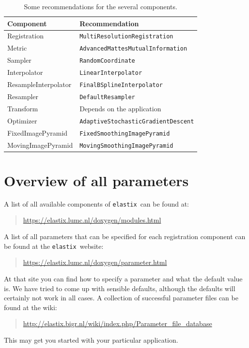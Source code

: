 \documentclass[]{report}
\newcommand{\elastix}{\texttt{elastix}}
\begin{document}
\begin{table}[htb]
\centering
\begin{tabular}{l|p{15em}}
\textbf{Component} & \textbf{Recommendation} \\
\hline
Registration & \texttt{MultiResolutionRegistration} \\
Metric       & \texttt{AdvancedMattesMutualInformation} \\
Sampler      & \texttt{RandomCoordinate} \\
Interpolator & \texttt{LinearInterpolator} \\
ResampleInterpolator & \texttt{FinalBSplineInterpolator} \\
Resampler    & \texttt{DefaultResampler}\\
Transform    & Depends on the application \\
Optimizer    & \texttt{AdaptiveStochasticGradientDescent} \\
FixedImagePyramid   & \texttt{FixedSmoothingImagePyramid} \\
MovingImagePyramid  & \texttt{MovingSmoothingImagePyramid} \\
\end{tabular}
\caption{Some recommendations for the several components.}\label{table:tutorial:components}
\end{table}

\section{Overview of all parameters}

A list of all available components of \elastix\ can be found at:
\begin{quote}
\url{https://elastix.lumc.nl/doxygen/modules.html}
\end{quote}
A list of all parameters that can be specified for each registration
component can be found at the \elastix\ website:
\begin{quote}
\url{https://elastix.lumc.nl/doxygen/parameter.html}
\end{quote}
At that site you can find how to specify a parameter and what the
default value is. We have tried to come up with sensible defaults,
although the defaults will certainly not work in all cases. A
collection of successful parameter files can be found at the wiki:
\begin{quote}
\url{http://elastix.bigr.nl/wiki/index.php/Parameter_file_database}
\end{quote}
This may get you started with your particular application.
\end{document}
